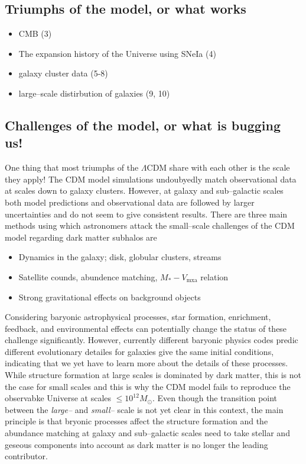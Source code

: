 \documentclass[paper=a4, fontsize=11pt]{scrartcl} %
\numberwithin{equation}{section} %
\numberwithin{figure}{section} %
\numberwithin{table}{section} %
\begin{document}
\subsection{Triumphs of the model, or what works}
\begin{itemize}
\item CMB (3)
\item The expansion history of the Universe using SNeIa (4)
\item galaxy cluster data (5-8)
\item large--scale distirbution of galaxies (9, 10)
\end{itemize}

\subsection{Challenges of the model, or what is bugging us!}
One thing that most triumphs of the $\Lambda$CDM share with each other is the scale they apply! The CDM model simulations undoubyedly match observational data at scales down to galaxy clusters. However, at galaxy and sub--galactic scales both model predictions and observational data are followed by larger uncertainties and do not seem to give consistent results. There are three main methods using which astronomers attack the small--scale challenges of the CDM model regarding dark matter subhalos are 
\begin{itemize}
\item Dynamics in the galaxy; disk, globular clusters, streams
\item Satellite counds, abundence matching, $M_* - V_\mathrm{mxa}$ relation 
\item Strong gravitational effects on background objects
\end{itemize}
Considering baryonic astrophysical processes, star formation, enrichment, feedback, and environmental effects can potentially change the status of these challenge significantly. However, currently different baryonic physics codes predic different evolutionary detailes for galaxies give the same initial conditions, indicating that we yet have to learn more about the details of these processes. While structure formation at large scales is dominated by dark matter, this is not the case for small scales and this is why the CDM model fails to reproduce the observabke Universe at scales $\leq 10^{12} M_\odot$. Even though the transition point between the \emph{large--} and \emph{small--} scale is not yet clear in this context, the main principle is that bryonic processes affect the structure formation and the abundance matching at galaxy and sub--galactic scales need to take stellar and geseous components into account as dark matter is no longer the leading contributor.
\end{document}
